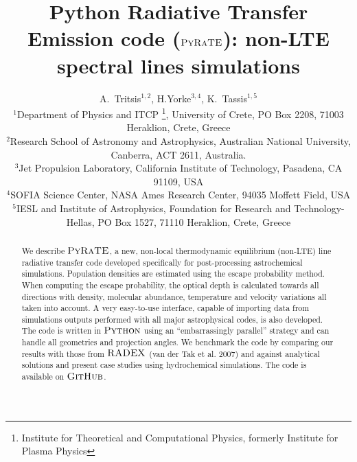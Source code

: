 \documentclass{mn2e}
\begin{document}
\title[Simulating non-LTE line transfer]
{Python Radiative Transfer Emission code ($\textsc{PyRaTE}$): non-LTE spectral lines simulations}

\author[Tritsis et al.]
  {A.~Tritsis$^{1, 2}$, H.Yorke$^{3, 4}$, K.~Tassis$^{1,5}$ \\
    $^1$Department of Physics and ITCP \thanks{Institute for Theoretical and Computational Physics, formerly Institute for Plasma Physics}, University of Crete, PO Box 2208, 71003 Heraklion, Crete, Greece\\
    $^2$Research School of Astronomy and Astrophysics, Australian National University, Canberra, ACT 2611, Australia.\\
    $^3$Jet Propulsion Laboratory, California Institute of Technology, Pasadena, CA 91109, USA\\
    $^4$SOFIA Science Center, NASA Ames Research Center, 94035 Moffett Field, USA\\
    $^5$IESL and Institute of Astrophysics, Foundation for Research and Technology-Hellas, PO Box 1527, 71110 Heraklion, Crete, Greece}
\maketitle 

\begin{abstract}

We describe $\textsc{PyRaTE}$, a new, non-local thermodynamic equilibrium (non-LTE) line radiative transfer code developed specifically for post-processing astrochemical simulations. Population densities are estimated using the escape probability method. When computing the escape probability, the optical depth is calculated towards all directions with density, molecular abundance, temperature and velocity variations all taken into account. A very easy-to-use interface, capable of importing data from simulations outputs performed with all major astrophysical codes, is also developed. The code is written in $\textsc{Python}$ using an ``embarrassingly parallel'' strategy and can handle all geometries and projection angles. We benchmark the code by comparing our results with those from $\textsc{RADEX}$ (van der Tak et al. 2007) and against analytical solutions and present case studies using hydrochemical simulations. The code is available on $\textsc{GitHub}$.\footnotemark{}

\end{abstract}
\end{document}
